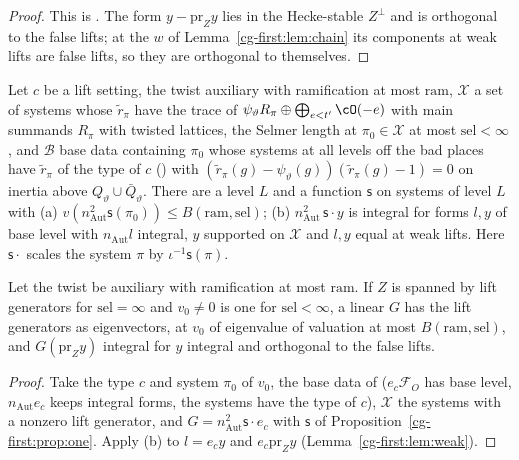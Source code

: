 \begin{proof}\sloppy
This is . The form
$y-\mathrm{pr}_Zy$ lies in the Hecke-stable $Z^\perp$ and is orthogonal to the false lifts; at the $w$
of Lemma~\ref{cg-first:lem:chain} its components at weak lifts are false lifts, so they are orthogonal
to themselves.
\end{proof}

\begin{proposition}
\label{cg-first:prop:one}
Let $c$ be a lift setting, the twist auxiliary with ramification at most $\mathrm{ram}$, $\mathcal X$
a set of systems whose $\tilde r_\pi$ have the trace of $\psi_\vartheta R_\pi\oplus\bigoplus_{e<t'}\cO(-e)$ with
main summands $R_\pi$ with twisted lattices, the Selmer length at $\pi_0\in\mathcal X$ at most
$\mathrm{sel}<\infty$, and $\mathcal B$ base data containing $\pi_0$ whose systems at all levels off the bad
places have $\tilde r_\pi$ of the type of $c$ () with
$(\tilde r_\pi(g)-\psi_\vartheta(g))(\tilde r_\pi(g)-1)=0$ on inertia above $Q_\vartheta\cup\bar Q_\vartheta$. There are a level $L$ and a function $\mathsf s$ on systems of level $L$ with
(a) $v(n_{\mathrm{Aut}}^2\mathsf s(\pi_0))\le B(\mathrm{ram},\mathrm{sel})$; (b) $n_{\mathrm{Aut}}^2\,\mathsf s\cdot y$ is integral for
forms $l,y$ of base level with $n_{\mathrm{Aut}}l$ integral, $y$ supported on $\mathcal X$ and $l,y$ equal at
weak lifts. Here $\mathsf s\cdot$ scales the system $\pi$ by $\iota^{-1}\mathsf s(\pi)$.
\end{proposition}

\begin{lemma}\label{cg-first:lem:one}
Let the twist be auxiliary with ramification at most $\mathrm{ram}$.
If $Z$ is spanned by lift generators for $\mathrm{sel}=\infty$ and $v_0\neq0$ is one for
$\mathrm{sel}<\infty$, a linear $G$ has the lift generators as eigenvectors, at $v_0$ of eigenvalue of
valuation at most $B(\mathrm{ram},\mathrm{sel})$, and $G(\mathrm{pr}_Zy)$ integral for $y$ integral and
orthogonal to the false lifts.
\end{lemma}

\begin{proof}
Take the type $c$ and system $\pi_0$ of $v_0$, the base data of 
($e_c\mathcal F_O$ has base level, $n_{\mathrm{Aut}}e_c$ keeps integral forms, the systems have the type of
$c$), $\mathcal X$ the systems with a nonzero lift generator, and $G=n_{\mathrm{Aut}}^2\mathsf s\cdot e_c$ with $\mathsf s$ of
Proposition~\ref{cg-first:prop:one}. Apply (b) to $l=e_cy$ and $e_c\mathrm{pr}_Zy$
(Lemma~\ref{cg-first:lem:weak}).
\end{proof}


